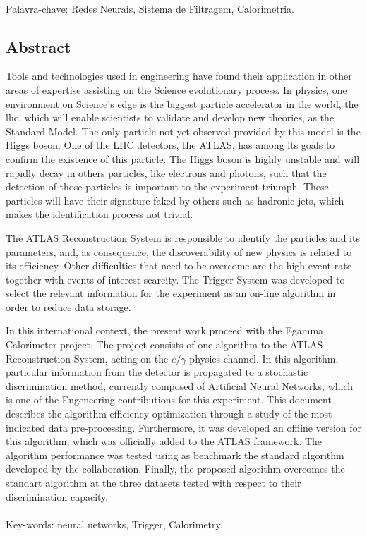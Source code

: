\paragraph*{}

\noindent Palavra-chave: Redes Neurais, Sistema de Filtragem, Calorimetria.

\vfill

\clearpage

\vfill
\begin{center}
\section*{Abstract\label{Abstract}}
\end{center}

Tools and technologies used in engineering have found their
application in other areas of expertise assisting on the Science evolutionary
process. In physics, one environment on Science's edge is the biggest
particle accelerator in the world, the \acrshort{lhc}, which will enable
scientists to validate and develop new theories, as the Standard Model. The only
particle not yet observed provided by this model is the Higgs boson. One of the LHC 
detectors, the ATLAS, has among its goals to confirm the existence
of this particle. The Higgs boson is highly unstable and will rapidly
decay in others particles, like electrons and photons, such that the detection
of those particles is important to the experiment triumph. These particles will 
have their signature faked by others such as hadronic jets, 
which makes the identification process not trivial.

The ATLAS Reconstruction System is responsible to identify the particles and its
parameters, and, as consequence, the discoverability of new physics is related to its
efficiency. Other difficulties that need to be overcome are the high event rate together
with events of interest scarcity. The Trigger System was developed to
select the relevant information for the experiment as an on-line algorithm in
order to reduce data storage.

In this international context, the present work proceed with the Egamma
Calorimeter project. The project consists of one algorithm to the 
ATLAS Reconstruction System, acting on the $e/\gamma$ physics channel. In this algorithm,
particular information from the detector is propagated to a stochastic
discrimination method, currently composed of Artificial Neural Networks, which
is one of the Engeneering contributions for this experiment.
This document describes the algorithm efficiency optimization through a study
of the most indicated data pre-processing. Furthermore, it was developed an
offline version for this algorithm, which was officially added to the ATLAS framework. 
The algorithm performance was tested using as benchmark the
standard algorithm developed by the collaboration. Finally, the proposed
algorithm overcomes the standart algorithm at the three datasets tested with
respect to their discrimination capacity.

\paragraph*{}

\noindent Key-words: neural networks, Trigger, Calorimetry.

\vfill
\clearpage
